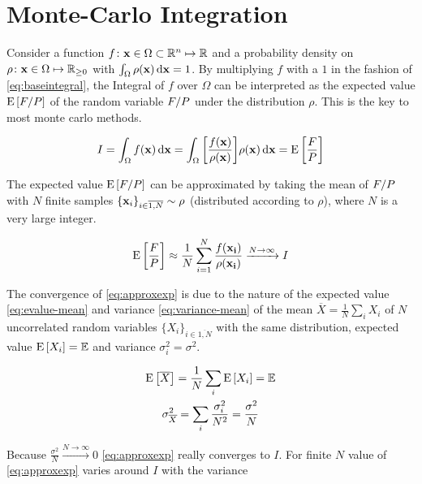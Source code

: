 \section{Monte-Carlo Integration}%
\label{sec:mcint}

Consider a function
\(f\colon \vb{x}\in\Omega\subset\mathbb{R}^n\mapsto\mathbb{R}\) and a
probability density on
\(\rho\colon \vb{x}\in\Omega\mapsto\mathbb{R}_{\geq 0}\) with
\(\int_{\Omega}\rho(\vb{x})\dd{\vb{x}} = 1\).  By multiplying \(f\)
with a \(1\) in the fashion of \cref{eq:baseintegral}, the Integral
of \(f\) over \(\Omega\) can be interpreted as the expected value
\(\operatorname{E}\qty[F/P]\) of the random variable \(F/P\) under the
distribution \(\rho\). This is the key to most monte carlo methods.

\begin{equation}
  \label{eq:baseintegral}
  I = \int_\Omega f(\vb{x}) \dd{\vb{x}} = \int_\Omega
  \qty[\frac{f(\vb{x})}{\rho(\vb{x})}] \rho(\vb{x}) \dd{\vb{x}} = \operatorname{E}\qty[\frac{F}{P}]
\end{equation}

The expected value \(\operatorname{E}\qty[F/P]\) can be approximated by taking the
mean of \(F/P\) with \(N\) finite samples
\(\{\vb{x}_i\}_{i\in\overline{1,N}}\sim\rho\) (distributed according
to \(\rho\)), where \(N\) is a very large integer.

\begin{equation}
  \label{eq:approxexp}
  \operatorname{E}\qty[\frac{F}{P}] \approx
  \frac{1}{N}\sum_{i=1}^N\frac{f(\vb{x_i})}{\rho(\vb{x_i})}
  \xrightarrow{N\rightarrow\infty} I
\end{equation}

The convergence of \cref{eq:approxexp} is due to the nature of the
expected value \cref{eq:evalue-mean} and
variance \cref{eq:variance-mean} of the mean
\(\overline{X} = \frac{1}{N}\sum_i X_i\) of \(N\) uncorrelated random
variables \(\{X_i\}_{i\in\overline{1,N}}\) with the same distribution,
expected value \(\operatorname{E}\qty[X_i]=\mathbb{E}\) and variance
\(\sigma_i^2 = \sigma^2\).

\begin{gather}
  \operatorname{E}\qty[\overline{X}] = \frac{1}{N}\sum_i\operatorname{E}\qty[X_i] = \mathbb{E} \label{eq:evalue-mean}\\
  \sigma^2_{\overline{X}} = \sum_i\frac{\sigma_i^2}{N^2} =
                            \frac{\sigma^2}{N}  \label{eq:variance-mean}
\end{gather}

Because
\(\frac{\sigma^2}{N}\xrightarrow{N\rightarrow\infty}
0\) \cref{eq:approxexp} really converges to \(I\). For finite \(N\)
value of \cref{eq:approxexp} varies around \(I\) with the variance

